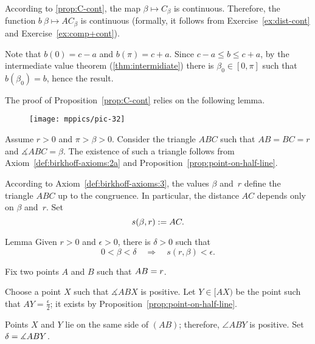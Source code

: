 According to \ref{prop:C-cont},
the map
$\beta\mapsto C_\beta$ is continuous.
Therefore, the function $b\:\beta\mapsto AC_\beta$ is continuous
(formally, it follows from Exercise~\ref{ex:dist-cont} and Exercise~\ref{ex:comp+cont}).

Note that $b(0)=c-a$ and $b(\pi)=c+a$.
Since $c-a\le b\le c+a$,
by the intermediate value theorem (\ref{thm:intermidiate})
there is $\beta_0\in[0,\pi]$ such that
$b(\beta_0)=b$,
hence the result. 
\qeds

The proof of Proposition~\ref{prop:C-cont} relies on the following lemma.

\begin{wrapfigure}{o}{27mm}
\vskip2mm
\centering
\texttt{[image: mppics/pic-32]}
\end{wrapfigure}

Assume $r>0$ and $\pi>\beta>0$.
Consider the triangle $ABC$ such that 
$AB=BC=r$ and $\measuredangle ABC=\beta$.
The existence of such a triangle follows from Axiom~\ref{def:birkhoff-axioms:2a} and Proposition~\ref{prop:point-on-half-line}.

According to Axiom~\ref{def:birkhoff-axioms:3}, 
the values
$\beta$ and~$r$ define the triangle $ABC$ up to the congruence.
In particular, the distance $AC$ depends only on $\beta$ and~$r$.
Set 
$$s(\beta,r):= AC.$$

\begin{thm}[\abs]{Lemma}\label{lem:f(r,a)}
Given $r>0$ and $\epsilon>0$, there is $\delta>0$ such that
\[0<\beta<\delta\quad\Longrightarrow\quad s(r,\beta)<\epsilon.\]

\end{thm}

Fix two points $A$ and $B$ such that $AB=r$.

Choose a point $X$ such that $\measuredangle ABX$ is positive.
Let $Y\in [AX)$ be the point such that $AY=\tfrac\epsilon2$;
it exists by Proposition~\ref{prop:point-on-half-line}.

Points $X$ and $Y$ lie on the same side of $(AB)$;
therefore, $\angle ABY$ is positive. 
Set $\delta=\measuredangle ABY$.

